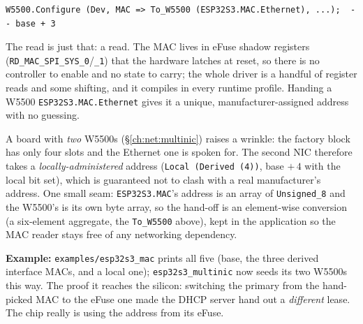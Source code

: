 \begin{lstlisting}
W5500.Configure (Dev, MAC => To_W5500 (ESP32S3.MAC.Ethernet), ...);  -- base + 3
\end{lstlisting}

The read is just that: a read. The MAC lives in eFuse shadow registers
(\texttt{RD\_MAC\_SPI\_SYS\_0}/\texttt{\_1}) that the hardware latches at reset, so there
is no controller to enable and no state to carry; the whole driver is a handful of
register reads and some shifting, and it compiles in every runtime profile. Handing a
W5500 \texttt{ESP32S3.MAC.Ethernet} gives it a unique, manufacturer-assigned address
with no guessing.

A board with \emph{two} W5500s (\S\ref{ch:net:multinic}) raises a wrinkle: the factory
block has only four slots and the Ethernet one is spoken for. The second NIC therefore
takes a \emph{locally-administered} address (\texttt{Local (Derived (4))}, base
$+\,4$ with the local bit set), which is guaranteed not to clash with a real
manufacturer's address. One small seam: \texttt{ESP32S3.MAC}'s address is an array of
\texttt{Unsigned\_8} and the W5500's is its own byte array, so the hand-off is an
element-wise conversion (a six-element aggregate, the \texttt{To\_W5500} above), kept
in the application so the MAC reader stays free of any networking dependency.

\noindent\textbf{Example:} \texttt{examples/esp32s3\_mac} prints all five (base, the
three derived interface MACs, and a local one); \texttt{esp32s3\_multinic} now seeds its
two W5500s this way. The proof it reaches the silicon: switching the primary from the
hand-picked MAC to the eFuse one made the DHCP server hand out a \emph{different} lease.
The chip really is using the address from its eFuse.

